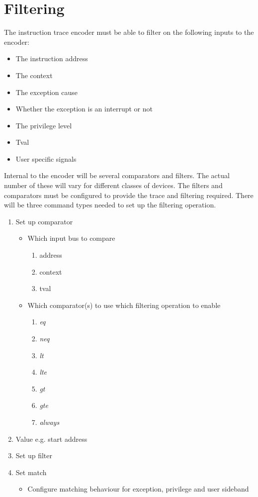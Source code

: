 \chapter{Filtering} \label{ch:filtering}


The instruction trace encoder must be able to filter on the following inputs to the encoder:

\begin{itemize}
  \item The instruction address 
  \item The context 
  \item The exception cause 
  \item Whether the exception is an interrupt or not 
  \item The privilege level
  \item Tval 
  \item User specific signals
\end{itemize}

Internal to the encoder will be several comparators and filters. The
actual number of these will vary for different classes of devices. The
filters and comparators must be configured to provide the trace and
filtering required. There will be three command types needed to set up
the filtering operation.

\begin{enumerate}
    \item Set up comparator 
    \begin{itemize}
      \item Which input bus to compare
        \begin {enumerate}
          \item address
          \item context
          \item tval
        \end{enumerate}
      \item Which comparator(s) to use which filtering operation to enable
        \begin {enumerate}
          \item \textit {eq}
          \item \textit {neq}
          \item \textit {lt}
          \item \textit {lte}
          \item \textit {gt}
          \item \textit {gte}
          \item \textit {always}
          \end{enumerate}
    \end{itemize}

  \item Value e.g. start address
    \item Set up filter 
    \item Set match 
    \begin{itemize}
      \item Configure matching behaviour for exception, privilege and user sideband
    \end{itemize}
\end{enumerate}


